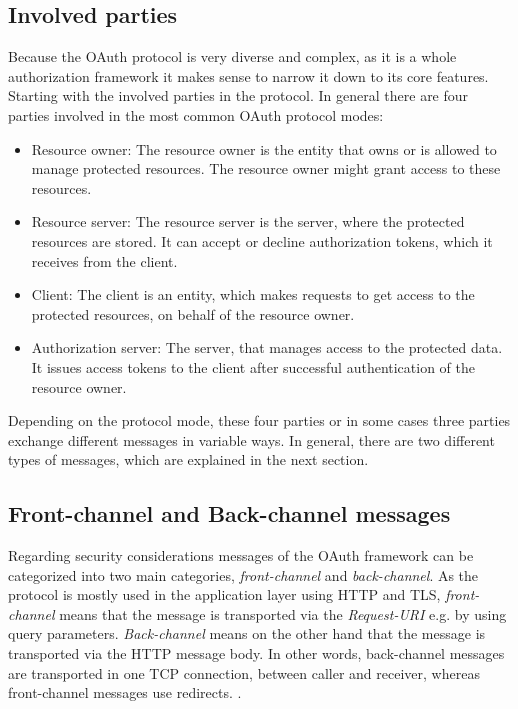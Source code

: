 \documentclass[
    fontsize=12pt,
    headings=small,
    parskip=half,           %
    bibliography=totoc,
    numbers=noenddot,       %
    open=any,               %
    ]{scrreprt}
\begin{document}
\subsection{Involved parties}
Because the OAuth protocol is very diverse and complex, as it is a
whole authorization framework it makes sense to narrow it down to its core
features. Starting with the involved parties in the protocol. In general there
are four parties involved in the most common OAuth protocol modes:

\begin{itemize} 

    \item Resource owner: The resource owner is the entity that owns or is
        allowed to manage protected resources. The resource owner might grant
        access to these resources. 

    \item Resource server: The resource server is the server, where the
        protected resources are stored. It can accept or decline authorization
        tokens, which it receives from the client. 

    \item Client: The client is an entity, which makes requests to get access
        to the protected resources, on behalf of the resource owner. 
        
    \item Authorization server: The server, that manages access to the
        protected data. It issues access tokens to the client after successful
        authentication of the resource owner. 

\end{itemize}

Depending on the protocol mode, these four parties or in some cases three
parties exchange different messages in variable ways. In general, there are two
different types of messages, which are explained in the next section.

\subsection{Front-channel and Back-channel messages}

Regarding security considerations messages of the OAuth framework can be
categorized into two main categories, \emph{front-channel} and
\emph{back-channel}. As the protocol is mostly used in the application layer
using HTTP and TLS, \emph{front-channel} means that the message is transported
via the \emph{Request-URI} \cite[Sec. 5.1.2]{fielding1999hypertext} e.g. by
using query parameters. \emph{Back-channel} means on the other hand that the
message is transported via the HTTP message body. In other words, back-channel
messages are transported in one TCP connection, between caller and receiver,
whereas front-channel messages use redirects. \cite[p. 338]{belfaik2022single}.
\end{document}
